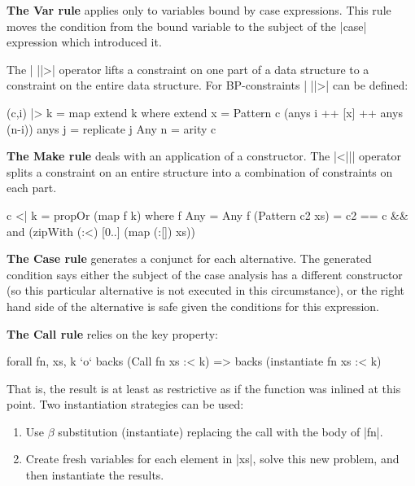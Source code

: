\documentclass[preprint]{sigplanconf}
\newcommand{\C}[1]{\textsf{#1}}
\newcommand{\para}[1]{\vspace{2mm}\noindent\textbf{#1}}
\newenvironment{discuss}
    {\noindent\hspace{-1.5mm}\vline\hspace{1mm}\vline\hspace{1mm}\begin{minipage}[h]{\linewidth}}
    {\end{minipage}}
\begin{document}
\para{The \C{Var} rule} applies only to variables bound by case expressions. This rule moves the condition from the bound variable to the subject of the |case| expression which introduced it.

The | ||>| operator lifts a constraint on one part of a data structure to a constraint on the entire data structure. For BP-constraints | ||>| can be defined:

\begin{code}
(c,i) |> k = map extend k
    where
    extend x = Pattern c (anys i ++ [x] ++ anys (n-i))
    anys j = replicate j Any
    n = arity c
\end{code}

\para{The \C{Make} rule} deals with an application of a constructor. The |<||| operator splits a constraint on an entire structure into a combination of constraints on each part.

\begin{code}
c <| k = propOr (map f k)
    where
    f Any = Any
    f (Pattern c2 xs) = c2 == c &&
        and (zipWith (:<) [0..] (map (:[]) xs))
\end{code}

\begin{discuss}
\para{The \C{Case} rule} generates a conjunct for each alternative. The generated condition says either the subject of the case analysis has a different constructor (so this particular alternative is not executed in this circumstance), or the right hand side of the alternative is safe given the conditions for this expression.
\end{discuss}

\para{The \C{Call} rule} relies on the key property:

\begin{code}
forall fn, xs, k `o`  backs (Call fn xs :< k) =>
                      backs (instantiate fn xs :< k)
\end{code}

That is, the result is at least as restrictive as if the function was inlined at this point. Two instantiation strategies can be used:

\begin{enumerate}
\item Use $\beta$ substitution (\C{instantiate}) replacing the call with the body of |fn|.
\item Create fresh variables for each element in |xs|, solve this new problem, and then instantiate the results.
\end{enumerate}
\end{document}
